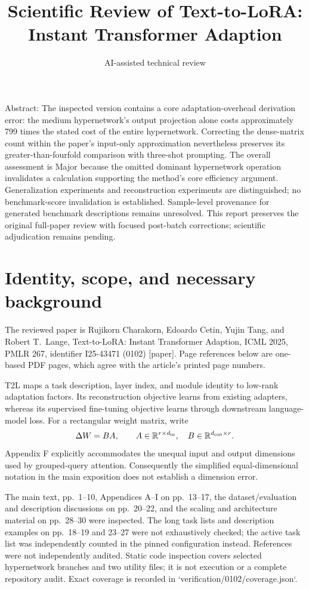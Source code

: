 \documentclass[10pt]{article}
\title{Scientific Review of
Text-to-LoRA: Instant Transformer Adaption}
\author{AI-assisted technical review}
\date{}
\begin{document}
\maketitle
Abstract: The inspected version contains a core adaptation-overhead derivation error: the medium hypernetwork’s output projection alone costs approximately 799 times the stated cost of the entire hypernetwork. Correcting the dense-matrix count within the paper’s input-only approximation nevertheless preserves its greater-than-fourfold comparison with three-shot prompting. The overall assessment is Major because the omitted dominant hypernetwork operation invalidates a calculation supporting the method’s core efficiency argument. Generalization experiments and reconstruction experiments are distinguished; no benchmark-score invalidation is established. Sample-level provenance for generated benchmark descriptions remains unresolved. This report preserves the original full-paper review with focused post-batch corrections; scientific adjudication remains pending.\par
\section*{Identity, scope, and necessary background}
The reviewed paper is Rujikorn Charakorn, Edoardo Cetin, Yujin Tang, and Robert T. Lange, Text-to-LoRA: Instant Transformer Adaption, ICML 2025, PMLR 267, identifier I25-43471 (0102) [paper]. Page references below are one-based PDF pages, which agree with the article’s printed page numbers.\par
T2L maps a task description, layer index, and module identity to low-rank adaptation factors. Its reconstruction objective learns from existing adapters, whereas its supervised fine-tuning objective learns through downstream language-model loss. For a rectangular weight matrix, write \[\Delta W=BA,\qquad A\in\mathbb R^{r\times d_{\rm in}},\quad
B\in\mathbb R^{d_{\rm out}\times r}.\] Appendix F explicitly accommodates the unequal input and output dimensions used by grouped-query attention. Consequently the simplified equal-dimensional notation in the main exposition does not establish a dimension error.\par
The main text, pp. 1–10, Appendices A–I on pp. 13–17, the dataset/evaluation and description discussions on pp. 20–22, and the scaling and architecture material on pp. 28–30 were inspected. The long task lists and description examples on pp. 18–19 and 23–27 were not exhaustively checked; the active task list was independently counted in the pinned configuration instead. References were not independently audited. Static code inspection covers selected hypernetwork branches and two utility files; it is not execution or a complete repository audit. Exact coverage is recorded in `verification/0102/coverage.json`.\par
\end{document}
